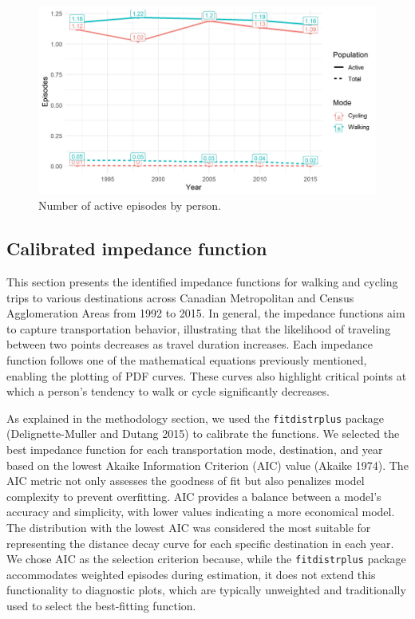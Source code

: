 \documentclass[preprint, 3p,
authoryear]{elsarticle} %
\begin{document}
\begin{figure}

{\centering \includegraphics[width=1\linewidth]{figures/episodes_per_person} 

}

\caption{Number of active episodes by person.}\label{fig:eps-per-person-fig}
\end{figure}

\hypertarget{calibrated-impedance-function}{%
\subsection{Calibrated impedance
function}\label{calibrated-impedance-function}}

This section presents the identified impedance functions for walking and
cycling trips to various destinations across Canadian Metropolitan and
Census Agglomeration Areas from 1992 to 2015. In general, the impedance
functions aim to capture transportation behavior, illustrating that the
likelihood of traveling between two points decreases as travel duration
increases. Each impedance function follows one of the mathematical
equations previously mentioned, enabling the plotting of PDF curves.
These curves also highlight critical points at which a person's tendency
to walk or cycle significantly decreases.

As explained in the methodology section, we used the
\texttt{fitdistrplus} package (Delignette-Muller and Dutang 2015) to
calibrate the functions. We selected the best impedance function for
each transportation mode, destination, and year based on the lowest
Akaike Information Criterion (AIC) value (Akaike 1974). The AIC metric
not only assesses the goodness of fit but also penalizes model
complexity to prevent overfitting. AIC provides a balance between a
model's accuracy and simplicity, with lower values indicating a more
economical model. The distribution with the lowest AIC was considered
the most suitable for representing the distance decay curve for each
specific destination in each year. We chose AIC as the selection
criterion because, while the \texttt{fitdistrplus} package accommodates
weighted episodes during estimation, it does not extend this
functionality to diagnostic plots, which are typically unweighted and
traditionally used to select the best-fitting function.
\end{document}
